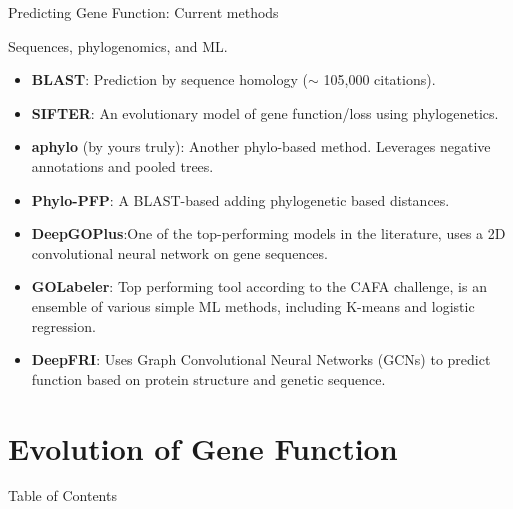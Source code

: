 \documentclass[10pt,aspectratio=169]{beamer}
\newcounter{frame}[frame]
\newcommand{\toc}[0]{\begin{frame}{Table of Contents}
    \tableofcontents[current]
\end{frame}}
\begin{document}
\begin{frame}{Predicting Gene Function: Current methods}
	
	Sequences, phylogenomics, and ML.
	
	\begin{itemize}[<+->]
		\item \textbf{BLAST}\autocite{altschulBasicLocalAlignment1990}: Prediction by sequence homology ($\sim$ 105,000 citations).
		\item \textbf{SIFTER}\autocite{Engelhardt2005, Engelhardt2011}: An evolutionary model of gene function/loss using phylogenetics.
		\item \textbf{aphylo}\autocite{VegaYon2021} (by yours truly): Another phylo-based method. Leverages negative annotations and pooled trees.
		\item \textbf{Phylo-PFP}\autocite{Jain2019}: A BLAST-based adding phylogenetic based distances.
		\item \textbf{DeepGOPlus}\autocite{kulmanovDeepGOPlusImprovedProtein2019}:One of the top-performing models in the literature, uses a 2D convolutional neural network on gene sequences.
		\item \textbf{GOLabeler}\autocite{youGOLabelerImprovingSequencebased2018}: Top performing tool according to the CAFA challenge\autocite{Zhou2019cafa}, is an ensemble of various simple ML methods, including K-means and logistic regression.
            \item \textbf{DeepFRI}\autocite{gligorijevicStructurebasedProteinFunction2021}: Uses Graph Convolutional Neural Networks (GCNs) to predict function based on protein structure and genetic sequence.
	\end{itemize}
	\vfill {}
\end{frame}

\section{Evolution of Gene Function}
\toc{}
\end{document}

